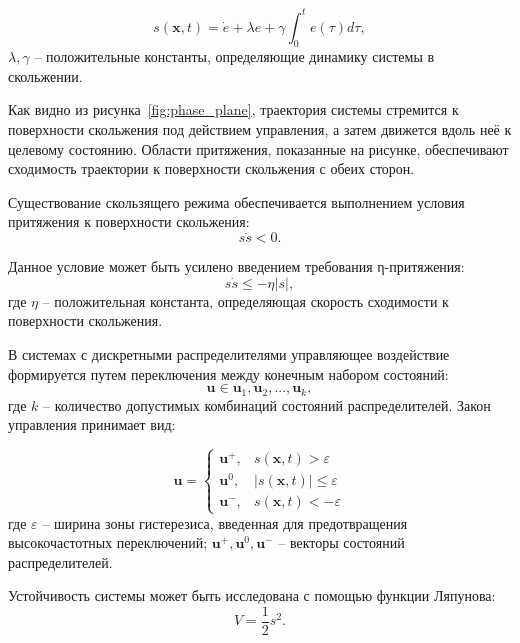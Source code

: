 \begin{equation}
	s(\mathbf{x}, t) = \dot{e} + \lambda e + \gamma\int_{0}^{t}e(\tau)d\tau,
\end{equation}
$\lambda, \gamma$ -- положительные константы, определяющие динамику системы в скольжении.

Как видно из рисунка~\ref{fig:phase_plane}, траектория системы стремится к поверхности скольжения под действием управления,
а затем движется вдоль неё к целевому состоянию. Области притяжения, показанные на рисунке,
обеспечивают сходимость траектории к поверхности скольжения с обеих сторон.

Существование скользящего режима обеспечивается выполнением условия притяжения к поверхности скольжения:
\begin{equation}
	s\dot{s} < 0.
\end{equation}

Данное условие может быть усилено введением требования η-притяжения:
\begin{equation}
	s\dot{s} \leq -\eta|s|,
\end{equation}
где $\eta$ -- положительная константа, определяющая скорость сходимости к поверхности скольжения.

В системах с дискретными распределителями управляющее воздействие формируется путем переключения между конечным набором состояний:
\begin{equation}
	\mathbf{u} \in {\mathbf{u}_1, \mathbf{u}_2, ..., \mathbf{u}_k},
\end{equation}
где $k$ -- количество допустимых комбинаций состояний распределителей. Закон управления принимает вид:

\begin{equation}
	\mathbf{u} = \begin{cases}
		\mathbf{u}^+, & s(\mathbf{x}, t) > \varepsilon      \\
		\mathbf{u}^0, & |s(\mathbf{x}, t)| \leq \varepsilon \\
		\mathbf{u}^-, & s(\mathbf{x}, t) < -\varepsilon
	\end{cases}
\end{equation}
где $\varepsilon$ -- ширина зоны гистерезиса, введенная для предотвращения высокочастотных переключений;
$\mathbf{u}^+, \mathbf{u}^0, \mathbf{u}^-$ -- векторы состояний распределителей.

Устойчивость системы может быть исследована с помощью функции Ляпунова:
\begin{equation}
	V = \frac{1}{2}s^2.
\end{equation}

